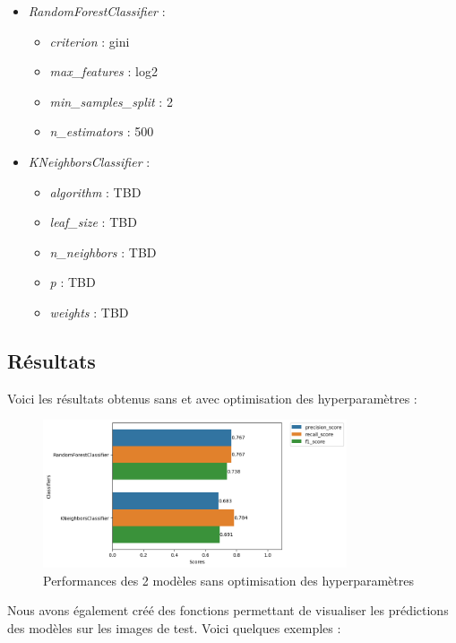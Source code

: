 \documentclass{article}
\begin{document}
\begin{small}
\begin{itemize}
    \item \textit{RandomForestClassifier} :
    \begin{itemize}
        \item \textit{criterion} : gini
        \item \textit{max\_features} : log2
        \item \textit{min\_samples\_split} : 2
        \item \textit{n\_estimators} : 500
    \end{itemize}
    \item \textit{KNeighborsClassifier} :
    \begin{itemize}
        \item \textit{algorithm} : TBD
        \item \textit{leaf\_size} : TBD
        \item \textit{n\_neighbors} : TBD
        \item \textit{p} : TBD
        \item \textit{weights} : TBD
    \end{itemize}
\end{itemize}
\end{small}

\subsection{Résultats}

Voici les résultats obtenus sans et avec optimisation des hyperparamètres :

\begin{figure}[h]
    \centering
    \includegraphics[width=0.8\textwidth]{img/img_perfs_without_cv_withou_hp.png}
    \caption{Performances des 2 modèles sans optimisation des hyperparamètres}
\end{figure}

\newpage
Nous avons également créé des fonctions permettant de visualiser les prédictions
des modèles sur les images de test. Voici quelques exemples : 
\end{document}
